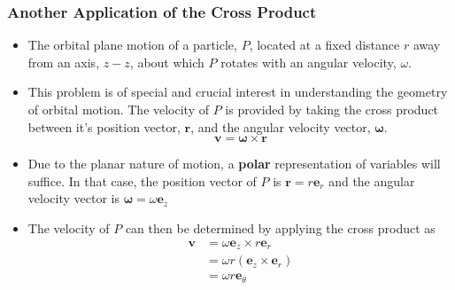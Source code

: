 \documentclass[11pt]{article}
\begin{document}
\subsubsection*{Another Application of the Cross Product}
\label{sec:org6bd25fe}
\begin{itemize}
\item The orbital plane motion of a particle, \(P\), located at a fixed distance \(r\) away from an axis, \(z-z\), about which \(P\) rotates with an angular velocity, \(\omega\).

\item This problem is of special and crucial interest in understanding the geometry of orbital motion.  The velocity of \(P\) is provided by taking the cross product between it's position vector, \(\boldsymbol{r}\), and the angular velocity vector, \(\boldsymbol{\omega}\).
$$ \boldsymbol{v} = \boldsymbol{\omega} \times \boldsymbol{r} $$

\item Due to the planar nature of motion, a \textbf{polar} representation of variables will suffice. In that case, the position vector of \(P\) is \(\boldsymbol{r} = r \boldsymbol{e}_r\) and the angular velocity vector is \(\boldsymbol{\omega} = \omega \boldsymbol{e}_z\)

\item The velocity of \(P\) can then be determined by applying the cross product as
\begin{align}
 \boldsymbol{v} & = \omega \boldsymbol{e}_z \times r \boldsymbol{e}_r \\
                & = \omega r (\boldsymbol{e}_z \times \boldsymbol{e}_r) \\
                & = \omega r \boldsymbol{e}_\theta
\end{align}
\end{itemize}
\end{document}
